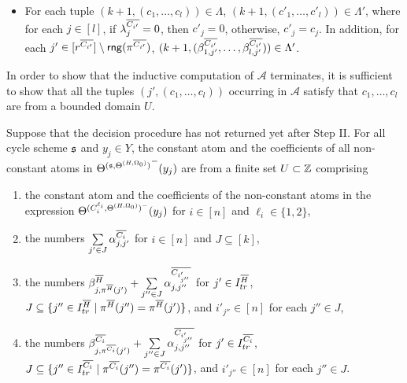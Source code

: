 \begin{enumerate}
\begin{itemize}
\begin{itemize}
\item For each tuple $(k+1, (c_1, \dots, c_l)) \in \Lambda$, $(k+1, (c'_1, \dots, c'_l)) \in \Lambda'$, where for each $j \in [l]$, if $\lambda^{\overline{C_{i'}}}_j = 0$, then $c'_{j}= 0$, otherwise, $c'_{j} = c_j$. In addition, for each $j' \in [r^{\overline{C_{i'}}}] \setminus \mathsf{rng}(\pi^{\overline{C_{i'}}})$, $(k+1, (\beta^{\overline{C_{i'}}}_{1, j'}, \dots, \beta^{\overline{C_{i'}}}_{l, j'})) \in \Lambda'$. 
\end{itemize}
\end{itemize}
\end{enumerate}


In order to show that the inductive computation of $\mathscr{A}$ terminates, it is sufficient to show that all the tuples $(j', (c_1, \dots, c_l))$ occurring in $\mathscr{A}$ satisfy that $c_1,\dots, c_l$ are from a bounded domain $U$.

\begin{lemma}\label{prop-bnd-domain-2}
	Suppose that the decision procedure has not returned yet after Step II. 
	For all cycle scheme ${\mathfrak{s} }$ and $y_j \in Y$, the constant atom and the coefficients of all non-constant atoms in ${\Theta^{({\mathfrak{s} }, \Theta^{(H,\Omega_0)})}}^-(y_j)$ are from a finite set $U \subset {\mathbb{Z} }$ comprising
	\begin{enumerate}
	\item the constant atom and the coefficients of the non-constant atoms in the expression $\Theta^{(C^{\ell_i}_{i}, \Theta^{(H, \Omega_0)})^-}(y_j)$ for $i\in [n]$ and $\ell_i \in \{1,2\}$,
	\item the numbers  $\sum \limits_{j' \in J} \alpha^{\overline{C_{i}}}_{j,j'}$ for $i \in [n]$ and $J \subseteq [k]$, 
	\item the numbers $\beta^{\overline{H}}_{j,\pi^{\overline{H}}(j')} + \sum \limits_{j'' \in J} \alpha^{\overline{C_{i'_{j''}}}}_{j,j''}$ for $j' \in I^{\overline{H}}_{tr}$, $J \subseteq \{j'' \in I^{\overline{H}}_{tr} \mid  \pi^{\overline{H}}(j'') = \pi^{\overline{H}}(j')\}$, and $i'_{j''} \in [n]$ for each $j'' \in J$, 
	\item the numbers $\beta^{\overline{C_i}}_{j,\pi^{\overline{C_i}}(j')} + \sum \limits_{j'' \in J} \alpha^{\overline{C_{i'_{j''}}}}_{j,j''}$ for $j' \in I^{\overline{C_i}}_{tr}$, $J \subseteq \{j'' \in I^{\overline{C_i}}_{tr} \mid  \pi^{\overline{C_i}}(j'') = \pi^{\overline{C_i}}(j')\}$, and $i'_{j''} \in [n]$  for each $j'' \in J$. 
	\end{enumerate}
\end{lemma}

